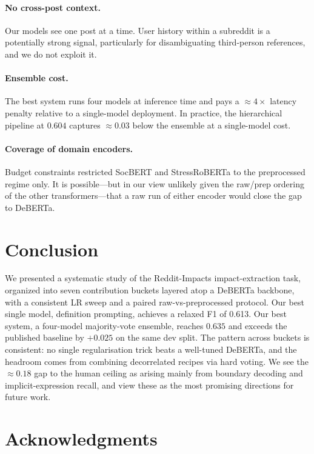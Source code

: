 \documentclass[11pt]{article}
\begin{document}
\paragraph{No cross-post context.} Our models see one post at a time.
User history within a subreddit is a potentially strong signal,
particularly for disambiguating third-person references, and we do not
exploit it.

\paragraph{Ensemble cost.} The best system runs four models at inference time and pays a $\approx 4\times$ latency penalty relative to a single-model deployment. In practice, the hierarchical pipeline at $0.604$ captures $\approx 0.03$ below the ensemble at a single-model cost.

\paragraph{Coverage of domain encoders.} Budget constraints restricted SocBERT and StressRoBERTa to the preprocessed regime only. It is possible---but in our view unlikely given the raw/prep ordering of the other transformers---that a raw run of either encoder would close the gap to DeBERTa.

\section{Conclusion}
\label{sec:conclusion}

We presented a systematic study of the Reddit-Impacts impact-extraction task, organized into seven contribution buckets layered atop a DeBERTa backbone, with a consistent LR sweep and a paired raw-vs-preprocessed protocol. Our best single model, definition prompting, achieves a relaxed F1 of 0.613. Our best system, a four-model majority-vote ensemble, reaches $0.635$ and exceeds the published baseline by $+0.025$ on the same dev split. The pattern across buckets is consistent: no single regularisation trick beats a well-tuned DeBERTa, and the headroom comes from combining decorrelated recipes via hard voting. We see the $\approx 0.18$ gap to the human ceiling as arising mainly from boundary decoding and implicit-expression recall, and view these as the most promising directions for future work.

\section*{Acknowledgments}
\end{document}
